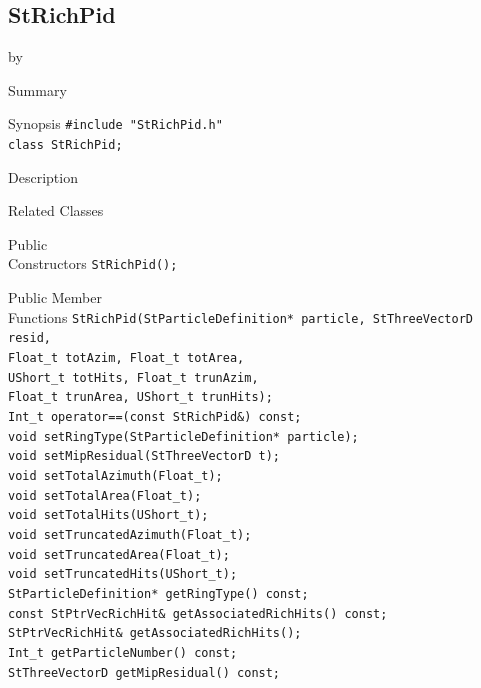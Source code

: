 \documentclass[twoside]{article}
\newcommand{\entrylabel}[1]{\mbox{\textbf{{#1}}}\hfil}%
\newenvironment{entry}
{\begin{list}{}%
    {\renewcommand{\makelabel}{\entrylabel}%
     \setlength{\labelwidth}{90pt}%
     \setlength{\leftmargin}{\labelwidth}
     \advance\leftmargin by \labelsep%
      }%
    }%
  {\end{list}}
\newcommand{\Entrylabel}[1]%
{\raisebox{0pt}[1ex][0pt]{\makebox[\labelwidth][l]%
    {\parbox[t]{\labelwidth}{\hspace{0pt}\textbf{{#1}}}}}}
\newenvironment{Entry}%
{\renewcommand{\entrylabel}{\Entrylabel}\begin{entry}}%
  {\end{entry}}
\begin{document}
\clearpage

\subsection{StRichPid}
\label{sec:StRichPid}
\begin{Entry}
\item[Summary]
\item[Synopsis]
    \verb+#include "StRichPid.h"+\\
    \verb+class StRichPid;+\\
\item[Description]
\item[Related Classes]
\item[Public\\ Constructors]
    \verb+StRichPid();+\\
\item[Public Member\\ Functions]
    \verb+StRichPid(StParticleDefinition* particle, StThreeVectorD resid,+\\
    \verb+Float_t totAzim, Float_t totArea,+\\
    \verb+UShort_t totHits, Float_t trunAzim,+\\
    \verb+Float_t trunArea, UShort_t trunHits);+\\
    \verb+Int_t operator==(const StRichPid&) const;+\\
    \verb+void setRingType(StParticleDefinition* particle);+\\
    \verb+void setMipResidual(StThreeVectorD t);+\\
    \verb+void setTotalAzimuth(Float_t);+\\
    \verb+void setTotalArea(Float_t);+\\
    \verb+void setTotalHits(UShort_t);+\\
    \verb+void setTruncatedAzimuth(Float_t);+\\
    \verb+void setTruncatedArea(Float_t);+\\
    \verb+void setTruncatedHits(UShort_t);+\\
    \verb+StParticleDefinition* getRingType() const;+\\
    \verb+const StPtrVecRichHit& getAssociatedRichHits() const;+\\
    \verb+StPtrVecRichHit& getAssociatedRichHits();+\\
    \verb+Int_t getParticleNumber() const;+\\
    \verb+StThreeVectorD getMipResidual() const;+\\

\end{Entry}
\end{document}
